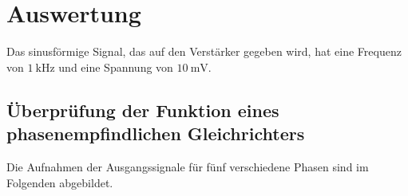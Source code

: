 \section{Auswertung}
\label{sec:Auswertung}

Das sinusförmige Signal, das auf den Verstärker gegeben wird, hat eine Frequenz
von $\SI{1}{\kilo\hertz}$ und eine Spannung von $\SI{10}{\milli\volt}$. %

\subsection{Überprüfung der Funktion eines phasenempfindlichen Gleichrichters}
\label{sec:teil1}
Die Aufnahmen der Ausgangssignale für fünf verschiedene Phasen sind im Folgenden abgebildet.
